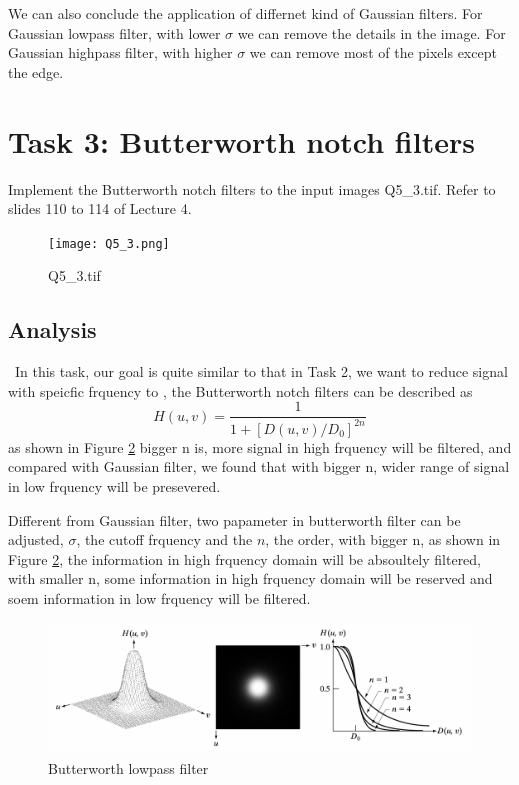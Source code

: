 \documentclass[
	12pt, %
]{style/fphw}
\begin{document}
We can also conclude the application of differnet kind of Gaussian filters. For Gaussian lowpass filter, with lower $\sigma$ we can remove the details in the image. For Gaussian highpass filter, with higher $\sigma$ we can remove most of the pixels except the edge.

\newpage
\section*{Task 3: Butterworth notch filters}

\begin{problem}
Implement the Butterworth notch filters to the input images Q5\_3.tif. Refer to slides 110 to 114 of Lecture 4.

\begin{figure}[H]
    \centering
    \texttt{[image: Q5\_3.png]}
    \caption{Q5\_3.tif}
    \label{Q5_3.tif}
\end{figure}

\end{problem}

\subsection*{Analysis} \
In this task, our goal is quite similar to that in Task 2, we want to reduce signal with speicfic frquency to , the Butterworth notch filters can be described as $$H(u,v)=\frac{1}{1+[D(u,v)/D_0]^{2n}}$$ as shown in Figure \ref{Butterworth.png} bigger n is, more signal in high frquency will be filtered, and compared with Gaussian filter, we found that with bigger n, wider range of signal in low frquency will be presevered.

Different from Gaussian filter, two papameter in butterworth filter can be adjusted, $\sigma$, the cutoff frquency and the $n$, the order, with bigger n, as shown in Figure \ref{Butterworth.png}, the information in high frquency domain will be absoultely filtered, with smaller n, some information in high frquency domain will be reserved and soem information in low frquency will be filtered.

\begin{figure}[H]
    \centering
    \includegraphics[width=0.8\linewidth]{chart/Butterworth.png}
    \caption{Butterworth lowpass filter}
    \label{Butterworth.png}
\end{figure}
\end{document}
